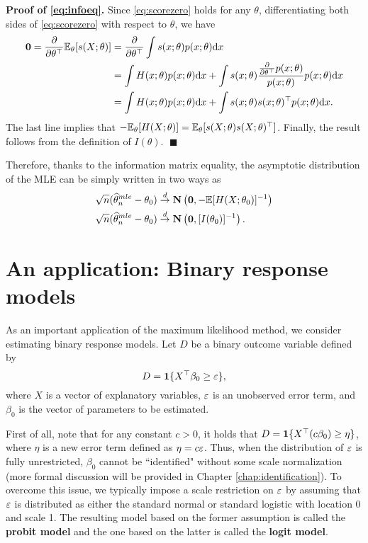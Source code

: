 \documentclass[11pt, A4paper, openany, uplatex]{book}
\begin{document}
\textbf{Proof of \eqref{eq:infoeq}.} \quad Since \eqref{eq:scorezero} holds for any $\theta$, differentiating both sides of \eqref{eq:scorezero} with respect to $\theta$, we have
\begin{align*}
	\mathbf{0} = \frac{\partial }{\partial \theta^\top} \mathbb{E}_\theta[s(X; \theta)] 
	& = \frac{\partial}{\partial \theta^\top}\int s(x; \theta) p(x; \theta) \mathrm{d}x \\
	& = \int H(x; \theta) p(x; \theta) \mathrm{d}x + \int s(x; \theta) \frac{\frac{\partial}{\partial \theta^\top} p(x; \theta)}{p(x; \theta)} p(x; \theta) \mathrm{d}x \\
	& = \int H(x; \theta) p(x; \theta) \mathrm{d}x + \int s(x; \theta) s(x; \theta)^\top p(x; \theta) \mathrm{d}x.
\end{align*} 
The last line implies that $-\mathbb{E}_\theta[H(X; \theta)] = \mathbb{E}_\theta[s(X; \theta) s(X; \theta)^\top]$.
Finally, the result follows from the definition of $I(\theta)$. $\; \blacksquare$

Therefore, thanks to the information matrix equality, the asymptotic distribution of the MLE can be simply written in two ways as
\begin{align*}
	& \sqrt{n}(\widehat \theta_n^{mle} - \theta_0) \overset{d}{\to} \mathbf{N}\left( \mathbf{0}, -\mathbb{E}[H(X; \theta_0)]^{-1}  \right) \\
	& \sqrt{n}(\widehat \theta_n^{mle} - \theta_0) \overset{d}{\to} \mathbf{N}\left( \mathbf{0}, [I(\theta_0)]^{-1}  \right).
\end{align*}

\section{An application: Binary response models}\label{sec:binary}
As an important application of the maximum likelihood method, we consider estimating binary response models.
Let $D$ be a binary outcome variable defined by
\[
	D = \mathbf{1}\{X^\top\beta_0 \ge \varepsilon\},
\]
where $X$ is a vector of explanatory variables, $\varepsilon$ is an unobserved error term, and $\beta_0$ is the vector of parameters to be estimated.

First of all, note that for any constant $c > 0$, it holds that  $D = \mathbf{1}\{X^\top(c\beta_0) \ge \eta\}$, where $\eta$ is a new error term defined as $\eta = c\varepsilon$.
Thus, when the distribution of $\varepsilon$ is fully unrestricted, $\beta_0$ cannot be ``identified" without some scale normalization (more formal discussion will be provided in Chapter \ref{chap:identification}). 
To overcome this issue, we typically impose a scale restriction on $\varepsilon$ by assuming that $\varepsilon$ is distributed as either the standard normal or standard logistic with location 0 and scale 1.
The resulting model based on the former assumption is called the \textbf{probit model} and the one based on the latter is called the \textbf{logit model}.
\end{document}
